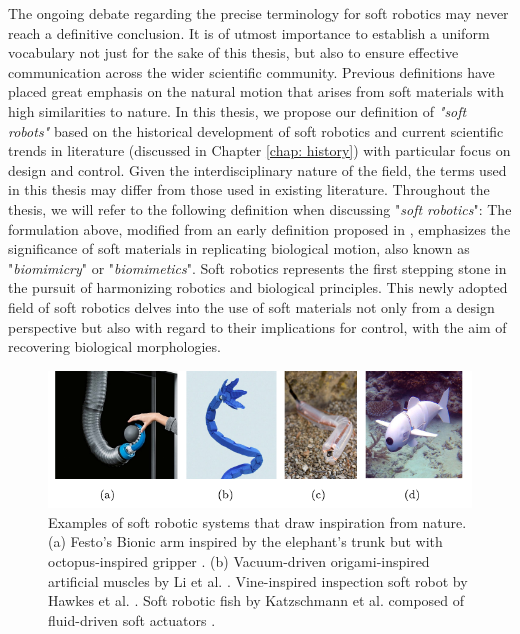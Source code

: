 \par The ongoing debate regarding the precise terminology for soft robotics may never reach a definitive conclusion. It is of utmost importance to establish a uniform vocabulary not just for the sake of this thesis, but also to ensure effective communication across the wider scientific community. Previous definitions have placed great emphasis on the natural motion that arises from soft materials with high similarities to nature. In this thesis, we propose our definition of \textit{"soft robots"} based on the historical development of soft robotics and current scientific trends in literature (discussed in Chapter \ref{chap: history}) with particular focus on design and control. Given the interdisciplinary nature of the field, the terms used in this thesis may differ from those used in existing literature. Throughout the thesis, we will refer to the following definition when discussing "\emph{soft robotics}":
%
%
The formulation above, modified from an early definition proposed in \cite{DellaSantina2020Springer}, emphasizes the significance of soft materials in replicating biological motion, also known as "\textit{biomimicry}" or "\textit{biomimetics}". Soft robotics represents the first stepping stone in the pursuit of harmonizing robotics and biological principles. This newly adopted field of soft robotics delves into the use of soft materials not only from a design perspective but also with regard to their implications for control, with the aim of recovering biological morphologies.

\begin{figure}[!t]
    \vspace{-2mm}
    \includegraphics*[width=\textwidth]{./pdf/thesis-figurex-0-0-1.pdf}
    \vspace{-6mm}
    \caption{\small Examples of soft robotic systems that draw inspiration from nature. (a) Festo's Bionic arm inspired by the elephant's trunk but with octopus-inspired gripper \cite{Grzesiak2011}. (b)  Vacuum-driven origami-inspired artificial muscles by Li et al. \cite{Li2017Dec}. Vine-inspired inspection soft robot by Hawkes et al. \cite{Hawkes2017}. Soft robotic fish by Katzschmann et al. \cite{Katzschmann2018} composed of fluid-driven soft actuators \cite{Marchese2014}.
    \label{fig:C0:softrobotexamples}}
    \vspace{-2mm}
  \end{figure}

